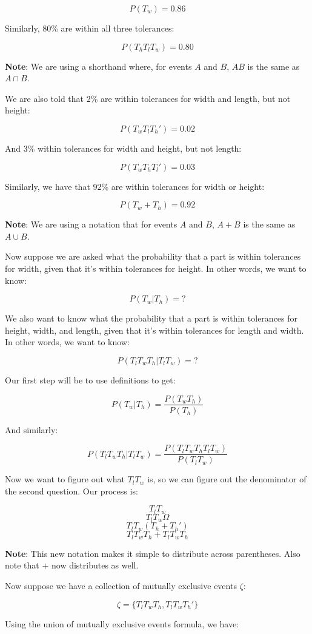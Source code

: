 \documentclass{article}
\begin{document}
\[
P(T_w)=0.86
\]

Similarly, 80\% are within all three tolerances:

\[
P(T_hT_lT_w)=0.80
\]

\textbf{Note}: We are using a shorthand where, for events $A$ and $B$,
$AB$ is the same as $A\cap{}B$.

We are also told that 2\% are within tolerances for width and length,
but not height:

\[
P(T_wT_lT_h')=0.02
\]

And 3\% within tolerances for width and height, but not length:

\[
P(T_wT_hT_l')=0.03
\]

Similarly, we have that 92\% are within tolerances for width or height:

\[
P(T_w+T_h)=0.92
\]

\textbf{Note}: We are using a notation that for events $A$ and $B$,
$A+B$ is the same as $A\cup{}B$.

Now suppose we are asked what the probability that a part is within
tolerances for width, given that it's within tolerances for height. In
other words, we want to know:

\[
P(T_w|T_h)=?
\]

We also want to know what the probability that a part is within
tolerances for height, width, and length, given that it's within
tolerances for length and width. In other words, we want to know:

\[
P(T_lT_wT_h|T_lT_w)=
?
\]

Our first step will be to use definitions to get:

\[
P(T_w|T_h)=
\dfrac{P(T_wT_h)}{P(T_h)}
\]

And similarly:

\[
P(T_lT_wT_h|T_lT_w)=
\dfrac{P(T_lT_wT_hT_lT_w)}{P(T_lT_w)}
\]

Now we want to figure out what $T_lT_w$ is, so we can figure out the
denominator of the second question. Our process is:

\[
T_lT_w
\] \[
T_lT_w\Omega
\] \[
T_lT_w(T_h+T_h')
\] \[
T_lT_wT_h+T_lT_wT_h
\]

\textbf{Note}: This new notation makes it simple to distribute across
parentheses. Also note that $+$ now distributes as well.

Now suppose we have a collection of mutually exclusive events $\zeta$:

\[
\zeta=\{T_lT_wT_h,T_lT_wT_h'\}
\]

Using the union of mutually exclusive events formula, we have:
\end{document}
